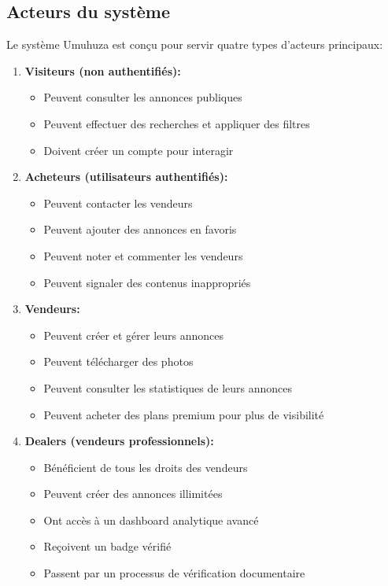 \documentclass[12pt,a4paper]{report}
\begin{document}
\subsection{Acteurs du système}

Le système Umuhuza est conçu pour servir quatre types d'acteurs principaux:

\begin{enumerate}
    \item \textbf{Visiteurs (non authentifiés):}
    \begin{itemize}
        \item Peuvent consulter les annonces publiques
        \item Peuvent effectuer des recherches et appliquer des filtres
        \item Doivent créer un compte pour interagir
    \end{itemize}

    \item \textbf{Acheteurs (utilisateurs authentifiés):}
    \begin{itemize}
        \item Peuvent contacter les vendeurs
        \item Peuvent ajouter des annonces en favoris
        \item Peuvent noter et commenter les vendeurs
        \item Peuvent signaler des contenus inappropriés
    \end{itemize}

    \item \textbf{Vendeurs:}
    \begin{itemize}
        \item Peuvent créer et gérer leurs annonces
        \item Peuvent télécharger des photos
        \item Peuvent consulter les statistiques de leurs annonces
        \item Peuvent acheter des plans premium pour plus de visibilité
    \end{itemize}

    \item \textbf{Dealers (vendeurs professionnels):}
    \begin{itemize}
        \item Bénéficient de tous les droits des vendeurs
        \item Peuvent créer des annonces illimitées
        \item Ont accès à un dashboard analytique avancé
        \item Reçoivent un badge vérifié
        \item Passent par un processus de vérification documentaire
    \end{itemize}


\end{enumerate}
\end{document}
